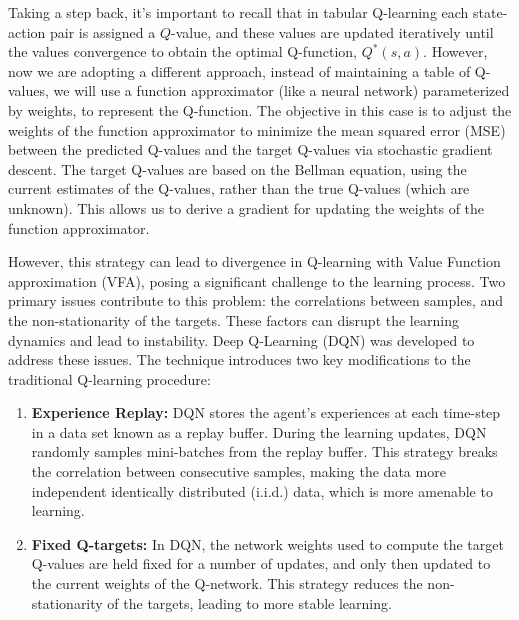 Taking a step back, it's important to recall that in tabular Q-learning each state-action pair is assigned a $Q$-value, and these values are updated iteratively until the values convergence to obtain the optimal Q-function, $Q^*(s, a)$. However,  now we are adopting a different approach, instead of maintaining a table of Q-values, we will use a function approximator (like a neural network) parameterized by weights, to represent the Q-function. 
The objective in this case is to adjust the weights of the function approximator to minimize the mean squared error (MSE) between the predicted Q-values and the target Q-values  via stochastic gradient descent. 
The target Q-values are based on the Bellman equation, using the current estimates of the Q-values, rather than the true Q-values (which are unknown). This allows us to derive a gradient for updating the weights of the function approximator. 

However, this strategy can lead to divergence in Q-learning with Value Function approximation (VFA), posing a significant challenge to the learning process. Two primary issues contribute to this problem: the correlations between samples, and the non-stationarity of the targets. These factors can disrupt the learning dynamics and lead to instability. Deep Q-Learning (DQN) was developed to address these issues. The technique introduces two key modifications to the traditional Q-learning procedure:
\begin{enumerate}
\item \textbf{Experience Replay:} DQN stores the agent's experiences at each time-step in a data set known as a replay buffer. During the learning updates, DQN randomly samples mini-batches from the replay buffer. This strategy breaks the correlation between consecutive samples, making the data more independent identically distributed (i.i.d.) data, which is more amenable to learning.
\item \textbf{Fixed Q-targets:} In DQN, the network weights used to compute the target Q-values are held fixed for a number of updates, and only then updated to the current weights of the Q-network. This strategy reduces the non-stationarity of the targets, leading to more stable learning.
\end{enumerate}








